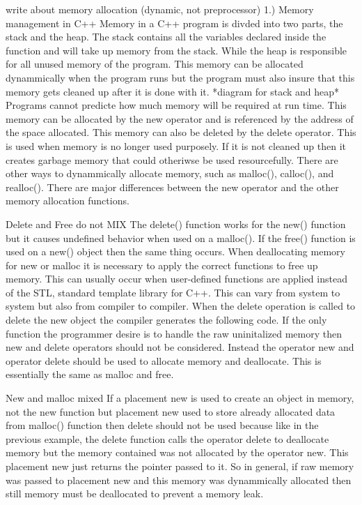 \documentclass[letterpaper, 12pt]{article}
\begin{document}
write about memory allocation (dynamic, not preprocessor)
1.) Memory management in C++
	Memory in a C++ program is divded into two parts, the stack and the heap. The stack contains all the variables
	declared inside the function and will take up memory from the stack. While the heap is responsible for all unused memory 
	of the program. This memory can be allocated dynammically when the program runs but the program must also insure that this
	memory gets cleaned up after it is done with it.
	*diagram for stack and heap*
	Programs cannot predicte how much memory will be required at run time. This memory can be allocated by the new operator 			and is referenced by the address of the space allocated. This memory can also be deleted by the delete operator. This is used 			when memory is no longer used purposely. If it is not cleaned up then it creates garbage memory that could otheriwse be used 		resourcefully. There are other ways to dynammically allocate memory, such as malloc(), calloc(), and realloc(). There are major 		differences between the new operator and the other memory allocation functions. 

	Delete and Free do not MIX
	The delete() function works for the new() function but it causes undefined behavior when used on a malloc(). If the free() function is used on a new() object then the same thing occurs. When deallocating memory for new or malloc it is necessary to apply the correct functions to free up memory. This can usually occur when user-defined functions are applied instead of the STL, standard template library for C++. This can vary from system to system but also from compiler to compiler. When the delete operation is called to delete the new object the compiler generates the following code.
	If the only function the programmer desire is to handle the raw uninitalized memory then new and delete operators should not be considered. Instead the operator new and operator delete should be used to allocate memory and deallocate. This is essentially the same as malloc and free.
	
	New and malloc mixed
	If a placement new is used to create an object in memory, not the new function but placement new used to store already allocated data from malloc() function then delete should not be used because like in the previous example, the delete function calls the operator delete to deallocate memory but the memory contained was not allocated by the operator new. This placement new just returns the pointer passed to it. So in general, if raw memory was passed to placement new and this memory was dynammically allocated then still memory must be deallocated to prevent a memory leak.
	
\end{document}
